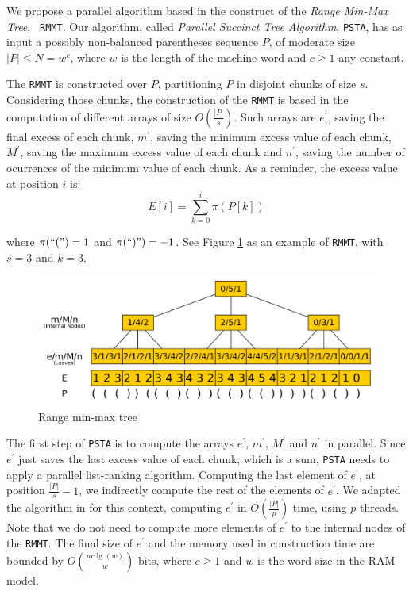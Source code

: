 We propose a parallel algorithm based in the construct of the
\emph{Range Min-Max Tree}, {\tt
  RMMT}\cite{Navarro:2014:FFS:2620785.2601073}. Our algorithm, called
\emph{Parallel Succinct Tree Algorithm}, {\tt PSTA}, has as input a
possibly non-balanced parentheses sequence $P$, of moderate size
$|P|\leq N = w^{c}$, where $w$ is the length of the machine word and
$c\geq 1$ any constant.

The {\tt RMMT} is constructed over $P$, partitioning $P$ in disjoint
chunks of size $s$. Considering those chunks, the construction of the
{\tt RMMT} is based in the computation of different arrays of size
$O(\frac{|P|}{s})$. Such arrays are $e^{\prime}$, saving the final
excess of each chunk, $m^{\prime}$, saving the minimum excess value of
each chunk, $M^{\prime}$, saving the maximum excess value of each
chunk and $n^{\prime}$, saving the number of ocurrences of the minimum
value of each chunk. As a reminder, the excess value at position $i$
is:
\begin{equation}
  \displaystyle E[i] = \sum_{k=0}^{i} \pi(P[k])
  \label{eq:excess}
\end{equation}

where $\pi(``(") = 1$ and $\pi(``)") = -1$. See Figure
\ref{fig:RangeMinMaxTree} as an example of {\tt RMMT}, with $s=3$ and
$k=3$.

\begin{figure}[ht]
  \centering
  \includegraphics[scale=0.18]{./images/Range-min-max-tree.png}
  \caption{Range min-max tree}
  \label{fig:RangeMinMaxTree} 
\end{figure}

The first step of {\tt PSTA} is to compute the arrays $e^{\prime}$,
$m^{\prime}$, $M^{\prime}$ and $n^{\prime}$ in parallel. Since
$e^{\prime}$ just saves the last excess value of each chunk, which is
a sum, {\tt PSTA} needs to apply a parallel list-ranking
algorithm. Computing the last element of $e^{\prime}$, at position
$\frac{|P|}{s}-1$, we indirectly compute the rest of the elements of
$e^{\prime}$. We adapted the algorithm in \cite{Helman2001265} for
this context, computing $e^{\prime}$ in $O(\frac{|P|}{p})$ time, using
$p$ threads. Note that we do not need to compute more elements of
$e^{\prime}$ to the internal nodes of the {\tt RMMT}. The final size
of $e^{\prime}$ and the memory used in construction time are bounded
by $O(\frac{nc\lg(w)}{w})$ bits, where $c\geqslant 1$ and $w$ is the
word size in the RAM model.

